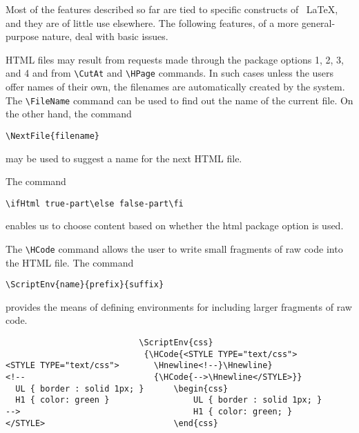 
Most of the features described so far are tied to specific constructs of
\ \LaTeX, and they are of little use elsewhere. The following features,
of a more general-purpose nature, deal with basic issues. 


HTML files may result from requests made through the package options 1,
2, 3, and 4 and from \verb|\CutAt| and \verb|\HPage| commands. In such
cases unless the users offer names of their own, the filenames are
automatically created by the system.  The \verb|\FileName| command can
be used to find out the name of the current file.  On the other hand,
the command 

\begin{lstlisting}
\NextFile{filename} 
\end{lstlisting}

may be used to suggest a name for the next HTML file. 


The command 
 
\begin{lstlisting}
\ifHtml true-part\else false-part\fi 
\end{lstlisting}

enables us to choose content based on whether the html package option is used. 


The \verb|\HCode| command allows the user to write small fragments of raw code into 
the HTML file. The command 

\begin{lstlisting}
\ScriptEnv{name}{prefix}{suffix} 
\end{lstlisting}

provides the means of defining environments for including larger
fragments of raw code. 

\begin{verbatim}
                           \ScriptEnv{css} 
                            {\HCode{<STYLE TYPE="text/css"> 
<STYLE TYPE="text/css">       \Hnewline<!--}\Hnewline} 
<!--                          {\HCode{-->\Hnewline</STYLE>}} 
  UL { border : solid 1px; }      \begin{css} 
  H1 { color: green }                 UL { border : solid 1px; } 
-->                                   H1 { color: green; } 
</STYLE>                          \end{css} 

\end{verbatim}

